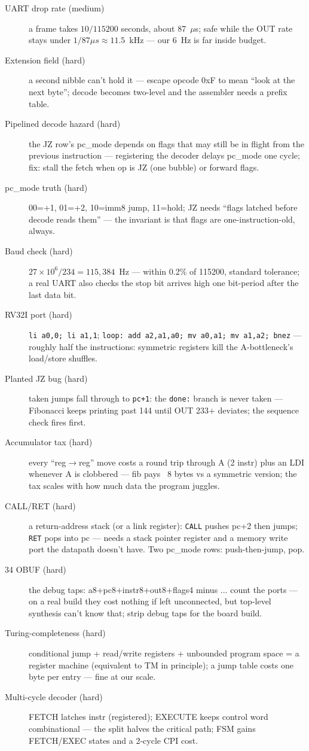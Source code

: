 \begin{description}
\item[UART drop rate (medium)] a frame takes $10/115200$ seconds,
about 87~$\mu$s; safe while the OUT rate stays under
$1/87\mu s \approx 11.5$~kHz --- our 6~Hz is far inside budget.
\item[Extension field (hard)] a second nibble can't hold it ---
escape opcode 0xF to mean ``look at the next byte''; decode becomes
two-level and the assembler needs a prefix table.
\item[Pipelined decode hazard (hard)] the JZ row's pc\_mode depends on
flags that may still be in flight from the previous instruction ---
registering the decoder delays pc\_mode one cycle; fix: stall the
fetch when op is JZ (one bubble) or forward flags.
\item[pc\_mode truth (hard)] 00=+1, 01=+2, 10=imm8 jump, 11=hold;
JZ needs ``flags latched before decode reads them'' --- the
invariant is that flags are one-instruction-old, always.
\item[Baud check (hard)] $27\times10^6/234=115{,}384$~Hz --- within
0.2\% of 115200, standard tolerance; a real UART also checks the stop
bit arrives high one bit-period after the last data bit.
\item[RV32I port (hard)] \texttt{li a0,0; li a1,1};\newline
\texttt{loop: add a2,a1,a0; mv a0,a1; mv a1,a2; bnez} --- roughly
half the instructions: symmetric registers kill the A-bottleneck's
load/store shuffles.
\item[Planted JZ bug (hard)] taken jumps fall through to
\texttt{pc+1}: the \texttt{done:} branch is never taken ---
Fibonacci keeps printing past 144 until OUT 233+ deviates; the
sequence check fires first.
\item[Accumulator tax (hard)] every ``reg$\to$reg'' move costs a
round trip through A (2 instr) plus an LDI whenever A is clobbered
--- fib pays ~8 bytes vs a symmetric version; the tax scales with
how much data the program juggles.
\item[CALL/RET (hard)] a return-address stack (or a link register):
\texttt{CALL} pushes pc+2 then jumps; \texttt{RET} pops into pc ---
needs a stack pointer register and a memory write port the datapath
doesn't have. Two pc\_mode rows: push-then-jump, pop.
\item[34 OBUF (hard)] the debug taps: a8+pc8+instr8+out8+flags4 minus
... count the ports --- on a real build they cost nothing if left
unconnected, but top-level synthesis can't know that; strip debug
taps for the board build.
\item[Turing-completeness (hard)] conditional jump + read/write
registers + unbounded program space = a register machine (equivalent
to TM in principle); a jump table costs one byte per entry ---
fine at our scale.
\item[Multi-cycle decoder (hard)] FETCH latches instr (registered);
EXECUTE keeps control word combinational --- the split halves the
critical path; FSM gains FETCH/EXEC states and a 2-cycle CPI cost.
\end{description}


